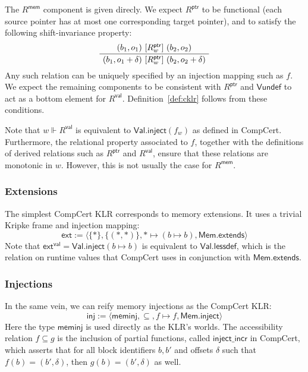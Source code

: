 \documentclass[acmsmall,timestamp,review,anonymous]{acmart}
\newcommand{\kw}[1]{\ensuremath{ \mathsf{#1} }}
\newcommand{\ifr}[1]{\ [{#1}]\ }
\begin{document}
The $R^\kw{mem}$ component is given direcly.
We expect $R^\kw{ptr}$ to be functional
(each source pointer has at most one corresponding target pointer),
and to satisfy the following shift-invariance property:
\[
  \AxiomC{$(b_1, o_1) \ifr{R^\kw{ptr}_w} (b_2, o_2)$}
  \UnaryInfC{$(b_1, o_1 + \delta) \ifr{R^\kw{ptr}_w} (b_2, o_2 + \delta)$}
  \DisplayProof
\]
Any such relation can be uniquely specified by
an injection mapping such as $f$.
We expect the remaining components to be consistent with $R^\kw{ptr}$
and $\kw{Vundef}$ to act as a bottom element for $R^\kw{val}$.
Definition~\ref{def:cklr} follows from these conditions.

Note that $w \Vdash R^\kw{val}$
is equivalent to $\kw{Val.inject}(f_w)$
as defined in CompCert.
Furthermore, the relational property associated to $f$,
together with the definitions of
derived relations such as $R^\kw{ptr}$ and $R^\kw{val}$,
ensure that these relations are monotonic in $w$.
However,
this is not usually the case for $R^\kw{mem}$.


\subsubsection{Extensions} %

The simplest CompCert KLR corresponds to memory extensions.
It uses a trivial Kripke frame and injection mapping:
\[
  \kw{ext} :=
    \langle \{*\}, \{(*,*)\}, * \mapsto (b \mapsto b), \kw{Mem.extends} \rangle
\]
Note that $\kw{ext}^\kw{val} = \kw{Val.inject}(b \mapsto b)$
is equivalent to $\kw{Val.lessdef}$,
which is the relation on runtime values that
CompCert uses in conjunction with \kw{Mem.extends}.


\subsubsection{Injections} %

In the same vein,
we can reify memory injections as the CompCert KLR:
\[
  \kw{inj} :=
    \langle
      \kw{meminj},
      {\subseteq}, %
      f \mapsto f,
      \kw{Mem.inject}
    \rangle
\]
Here the type \kw{meminj} is used directly
as the KLR's worlds.
The accessibility relation $f \subseteq g$
is the inclusion of partial functions,
called $\kw{inject\_incr}$ in CompCert,
which asserts that for all block identifiers $b, b'$ and offsets $\delta$
such that $f(b) = (b', \delta)$,
then $g(b) = (b', \delta)$ as well.
\end{document}
